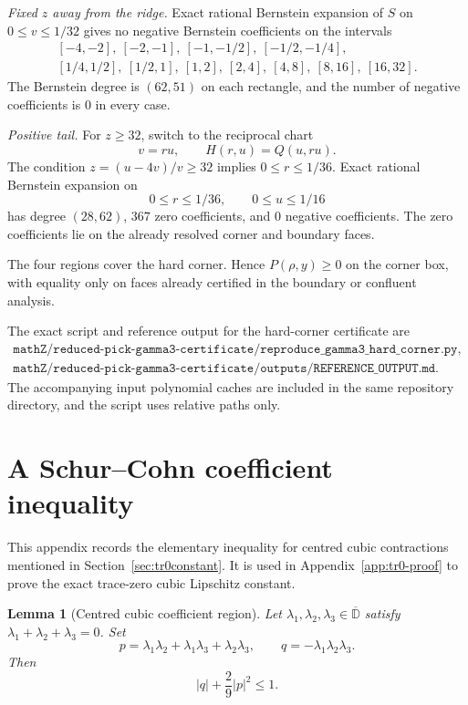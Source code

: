 \documentclass[11pt]{article}
\newtheorem{lemma}[theorem]{Lemma}
\numberwithin{equation}{section}
\newcommand{\bbD}{\mathbb D}
\begin{document}
\smallskip
\noindent\textit{Fixed \(z\) away from the ridge.}
Exact rational Bernstein expansion of \(S\) on \(0\le v\le1/32\) gives no
negative Bernstein coefficients on the intervals
\[
\begin{gathered}
[-4,-2],\ [-2,-1],\ [-1,-1/2],\ [-1/2,-1/4],\\
[1/4,1/2],\ [1/2,1],\ [1,2],\ [2,4],\ [4,8],\ [8,16],\ [16,32].
\end{gathered}
\]
The Bernstein degree is \((62,51)\) on each rectangle, and the number of
negative coefficients is \(0\) in every case.

\smallskip
\noindent\textit{Positive tail.}
For \(z\ge32\), switch to the reciprocal chart
\[
  v=ru,\qquad H(r,u)=Q(u,ru).
\]
The condition \(z=(u-4v)/v\ge32\) implies \(0\le r\le1/36\).  Exact rational
Bernstein expansion on
\[
  0\le r\le1/36,\qquad 0\le u\le1/16
\]
has degree \((28,62)\), \(367\) zero coefficients, and \(0\) negative
coefficients.  The zero coefficients lie on the already resolved corner and
boundary faces.

\smallskip
The four regions cover the hard corner.  Hence \(P(\rho,y)\ge0\) on the
corner box, with equality only on faces already certified in the boundary or
confluent analysis.

The exact script and reference output for the hard-corner certificate are
\[
\begin{gathered}
\texttt{mathZ/reduced-pick-gamma3-certificate/reproduce\_gamma3\_hard\_corner.py},\\
\texttt{mathZ/reduced-pick-gamma3-certificate/outputs/REFERENCE\_OUTPUT.md}.
\end{gathered}
\]
The accompanying input polynomial caches are included in the same repository
directory, and the script uses relative paths only.


\section{A Schur--Cohn coefficient inequality}\label{app:coeff-region}

This appendix records the elementary inequality for centred cubic
contractions mentioned in Section~\ref{sec:tr0constant}.  It is used in
Appendix~\ref{app:tr0-proof} to prove the exact trace-zero cubic Lipschitz
constant.

\begin{lemma}[Centred cubic coefficient region]\label{lem:appendix-centered-cubic}
Let \(\lambda_1,\lambda_2,\lambda_3\in\overline{\bbD}\) satisfy
\(\lambda_1+\lambda_2+\lambda_3=0\).  Set
\[
  p=\lambda_1\lambda_2+\lambda_1\lambda_3+\lambda_2\lambda_3,
  \qquad
  q=-\lambda_1\lambda_2\lambda_3.
\]
Then
\[
  |q|+\frac{2}{9}|p|^2\le1.
\]
\end{lemma}
\end{document}
